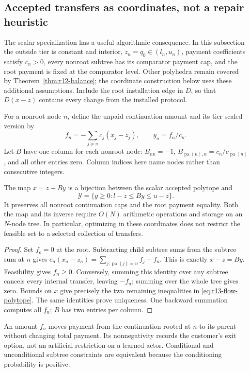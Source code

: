 \subsection{Accepted transfers as coordinates, not a repair heuristic}\label{sec:r13-flow}
The scalar specialization has a useful algorithmic consequence. In this subsection the outside tier is constant and interior, $z_n=q_0\in(l_n,u_n)$, payment coefficients satisfy $c_n>0$, every nonroot subtree has its comparator payment cap, and the root payment is fixed at the comparator level. Other polyhedra remain covered by Theorem~\ref{thm:r12-balance}; the coordinate construction below uses these additional assumptions. Include the root installation edge in $D$, so that $D(x-z)$ contains every change from the installed protocol.

For a nonroot node $n$, define the unpaid continuation amount and its tier-scaled version by
\[
 f_n=-\sum_{j\succeq n}c_j(x_j-z_j),\qquad y_n=f_n/c_n.
\]
Let $B$ have one column for each nonroot node: $B_{nn}=-1$, $B_{\operatorname{pa}(n),n}=c_n/c_{\operatorname{pa}(n)}$, and all other entries zero. Column indices here name nodes rather than consecutive integers.
\begin{proposition}\label{prop:r13-flow}
The map $x=z+By$ is a bijection between the scalar accepted polytope and
\begin{equation}\label{eq:r13-flow-polytope}
 \mathcal Y=\{y\geq0:l-z\leq By\leq u-z\}.
\end{equation}
It preserves all nonroot continuation caps and the root payment equality. Both the map and its inverse require $O(N)$ arithmetic operations and storage on an $N$-node tree. In particular, optimizing in these coordinates does not restrict the feasible set to a selected collection of transfers.
\end{proposition}
\begin{proof}
Set $f_o=0$ at the root. Subtracting child subtree sums from the subtree sum at $n$ gives
$c_n(x_n-z_n)=\sum_{j:\operatorname{pa}(j)=n}f_j-f_n$.
This is exactly $x-z=By$. Feasibility gives $f_n\geq0$. Conversely, summing this identity over any subtree cancels every internal transfer, leaving $-f_n$; summing over the whole tree gives zero. Bounds on $x$ give precisely the two remaining inequalities in \eqref{eq:r13-flow-polytope}. The same identities prove uniqueness. One backward summation computes all $f_n$; $B$ has two entries per column.
\end{proof}
An amount $f_n$ moves payment from the continuation rooted at $n$ to its parent without changing total payment. Its nonnegativity records the customer's exit option, not an artificial restriction on a learned actor. Conditional and unconditional subtree constraints are equivalent because the conditioning probability is positive.

